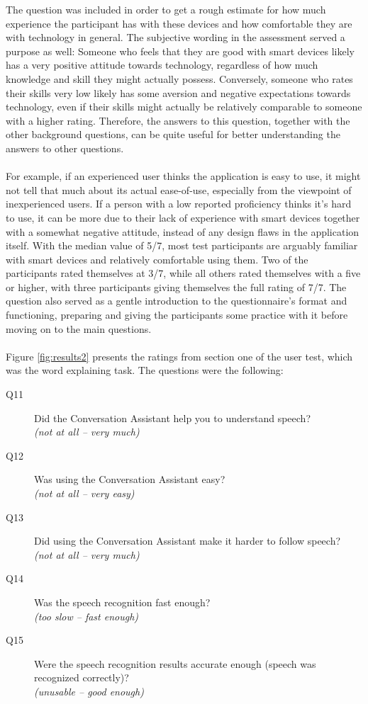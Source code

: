 \documentclass[english, 12pt, a4paper, pdftex, elec, utf8]{aaltothesis}
\begin{document}
The question was included in order to get a rough estimate for how much experience the participant has with these devices and how comfortable they are with technology in general. The subjective wording in the assessment served a purpose as well: Someone who feels that they are good with smart devices likely has a very positive attitude towards technology, regardless of how much knowledge and skill they might actually possess. Conversely, someone who rates their skills very low likely has some aversion and negative expectations towards technology, even if their skills might actually be relatively comparable to someone with a higher rating. Therefore, the answers to this question, together with the other background questions, can be quite useful for better understanding the answers to other questions. \\\\
For example, if an experienced user thinks the application is easy to use, it might not tell that much about its actual ease-of-use, especially from the viewpoint of inexperienced users. If a person with a low reported proficiency thinks it's hard to use, it can be more due to their lack of experience with smart devices together with a somewhat negative attitude, instead of any design flaws in the application itself. With the median value of 5/7, most test participants are arguably familiar with smart devices and relatively comfortable using them. Two of the participants rated themselves at 3/7, while all others rated themselves with a five or higher, with three participants giving themselves the full rating of 7/7. The question also served as a gentle introduction to the questionnaire's format and functioning, preparing and giving the participants some practice with it before moving on to the main questions. \\\\
Figure \ref{fig:results2} presents the ratings from section one of the user test, which was the word explaining task. The questions were the following:
\begin{description}
    \item[Q11] Did the Conversation Assistant help you to understand speech? \\ \textit{(not at all -- very much)}
    \item[Q12] Was using the Conversation Assistant easy? \\ \textit{(not at all -- very easy)}
    \item[Q13] Did using the Conversation Assistant make it harder to follow speech? \\ \textit{(not at all -- very much)}
    \item[Q14] Was the speech recognition fast enough? \\ \textit{(too slow -- fast enough)}
    \item[Q15] Were the speech recognition results accurate enough (speech was recognized correctly)? \\ \textit{(unusable -- good enough)}
\end{description}
\end{document}
